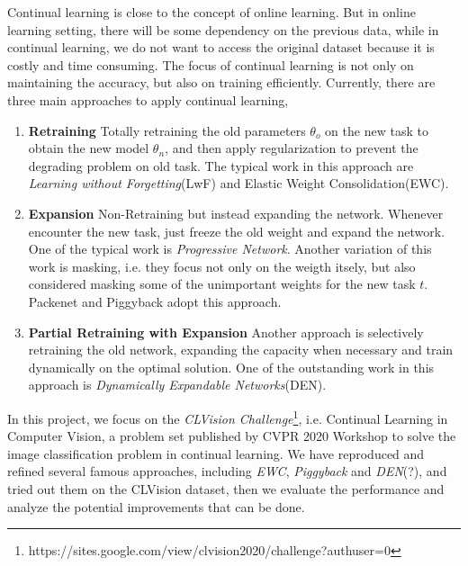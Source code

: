 Continual learning is close to the concept of online learning. But in online learning setting, there will be some dependency on the previous data, while in continual learning, we do not want to access the original dataset because it is costly and time consuming. The focus of continual learning is not only on maintaining the accuracy, but also on training efficiently. Currently, there are three main approaches to apply continual learning,
\begin{enumerate}
\item \textbf{Retraining}
Totally retraining the old parameters $\theta_o$ on the new task to obtain the new model $\theta_n$, and then apply regularization to prevent the degrading problem on old task. The typical work in this approach are \textit{Learning without Forgetting}(LwF)\cite{li2017learning} and  Elastic Weight Consolidation(EWC)\cite{kirkpatrick2017overcoming}. 
\item \textbf{Expansion}
Non-Retraining but instead expanding the network. Whenever encounter the new task, just freeze the old weight and expand the network. One of the typical work is \textit{Progressive Network}\cite{rusu2016progressive}. Another variation of this work is masking, i.e. they focus not only on the weigth itsely, but also considered masking some of the unimportant weights for the new task $t$. Packenet\cite{mallya2018packnet} and Piggyback\cite{mallya2018piggyback} adopt this approach.
\item \textbf{Partial Retraining with Expansion}
Another approach is selectively retraining the old network, expanding the capacity when necessary and train dynamically on the optimal solution. One of the outstanding work in this approach is \textit{Dynamically Expandable Networks}(DEN)\cite{yoon2017lifelong}.
\end{enumerate}

In this project, we focus on the \textit{CLVision Challenge}\footnote{https://sites.google.com/view/clvision2020/challenge?authuser=0}, i.e. Continual Learning in Computer Vision, a problem set published by CVPR 2020 Workshop to solve the image classification problem in continual learning. We have reproduced and refined several famous approaches, including \textit{EWC}, \textit{Piggyback} and \textit{DEN}(?), and tried out them on the CLVision dataset, then we evaluate the performance and analyze the potential improvements that can be done. 